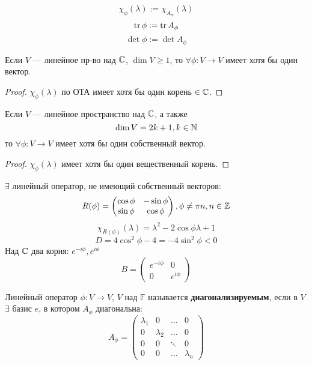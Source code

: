 \begin{symb}
  \[
  \chi_\phi(\lambda) := \chi_{A_\phi}(\lambda)
  \]
  \[
  \operatorname{tr} \phi := \operatorname{tr} A_\phi
  \]
  \[
  \det \phi := \det A_\phi
  \]
\end{symb}
\begin{consequence}
\label{consequence:04_1}
Если $V$ --- линейное пр-во над $\mathbb{C}$, $\dim V \geq 1$, то $\forall \phi \colon V \rightarrow V$ имеет хотя бы один вектор.
\end{consequence}
\begin{proof}
$\chi_\phi(\lambda)$ по ОТА имеет хотя бы один корень $\in \mathbb{C}$.
\end{proof}
\begin{consequence}
\label{consequence:04_2}
Если $V$ --- линейное пространство над $\mathbb{C}$, а также
\[
  \dim V = 2k + 1, k \in \mathbb{N}
\]
то $\forall \phi \colon V \rightarrow V$ имеет хотя бы один собственный вектор.
\end{consequence}
\begin{proof}
  $\chi_\phi(\lambda)$ имеет хотя бы один вещественный корень.
\end{proof}
\begin{note}
$\exists $ линейный оператор, не имеющий собственный векторов:
\[
  R(\phi) = \begin{pmatrix}\cos \phi & -\sin \phi \\ \sin \phi & \cos \phi \end{pmatrix}, \phi \neq \pi n, n \in \mathbb{Z}
\]
\[
\chi_{R(\phi)}(\lambda) = \lambda^{2} - 2\cos \phi \lambda + 1
\]
\[
  D = 4\cos^{2} \phi - 4 = -4\sin^{2}\phi < 0
\]
Над $\mathbb{C}$ два корня: $e^{-i\phi}, e^{i\phi}$
\[
  B = \begin{pmatrix}e^{-i\phi} & 0 \\ 0 & e^{i\phi} \end{pmatrix}
\]
\end{note}
\begin{definition}
  Линейный оператор $\phi \colon V \rightarrow V$, $V$ над $\mathbb{F}$ называется \textbf{диагонализируемым}, если в $V$ $\exists$ базис $e$, в котором $A_\phi$ диагональна:
  \[
    A_\phi = \begin{pmatrix} \lambda_1 & 0 & \ldots & 0 \\ 0 & \lambda_2 & \ldots & 0 \\ 0 & 0 & \ddots &  0 \\ 0 & 0 & \ldots & \lambda_n\end{pmatrix}
  \]
\end{definition}

